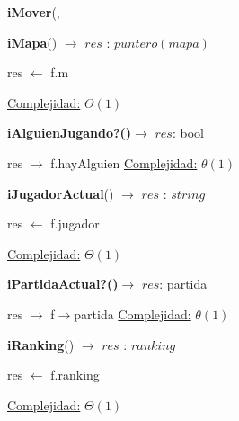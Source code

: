 \documentclass[10pt,a4paper]{article}
\begin{document}
\begin{Algoritmos}
\begin{algorithm}[H]{\textbf{iMover}(, }
    \end{algorithm}
        
    \begin{algorithm}[H]{\textbf{iMapa}() $\to$ $res$ : $puntero(mapa)$}
        \begin{algorithmic}
        
            \State res $\leftarrow$ f.m
            
        
            \Statex \underline{Complejidad:} $\Theta(1)$
        \end{algorithmic}
    \end{algorithm}
    
    \begin{algorithm}[H]{\textbf{iAlguienJugando?()}}$\to$ $res$: bool
        \begin{algorithmic}
            \State res $\to$ f.hayAlguien
            \State \underline{Complejidad:} $\theta(1)$
        \end{algorithmic}
    \end{algorithm}

    \begin{algorithm}[H]{\textbf{iJugadorActual}() $\to$ $res$ : $string$}
        \begin{algorithmic}
        
            \State res $\leftarrow$ f.jugador
            
        
            \Statex \underline{Complejidad:} $\Theta(1)$
        \end{algorithmic}
    \end{algorithm}

    \begin{algorithm}[H]{\textbf{iPartidaActual?()}}$\to$ $res$: partida
        \begin{algorithmic}
            \State res $\to$ f$\to$partida
            \State \underline{Complejidad:} $\theta(1)$
        \end{algorithmic}
    \end{algorithm}
        
    \begin{algorithm}[H]{\textbf{iRanking}() $\to$ $res$ : $ranking$}
        \begin{algorithmic}
        
            \State res $\leftarrow$ f.ranking
            
        
            \Statex \underline{Complejidad:} $\Theta(1)$
        \end{algorithmic}
    \end{algorithm}


\end{Algoritmos}
\end{document}
